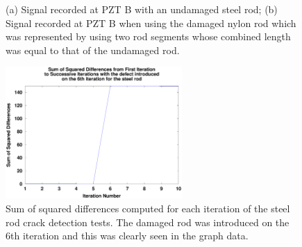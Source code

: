 \begin{figure}[ht!]
\begin{subfigmatrix}{2}
\end{subfigmatrix}

  \caption
  { \label{fig:steelCrackResults}
(a) Signal recorded at PZT B with an undamaged steel rod;
(b) Signal recorded at PZT B when using the damaged nylon rod which was represented by using two rod segments whose combined length was equal to that of the undamaged rod.
}
\end{figure}

\begin{figure}[ht!]
\centering
\includegraphics[width=0.6\textwidth]{eps_pics/steelDifferences}
\caption{Sum of squared differences computed for each iteration of the steel rod crack detection tests. The damaged rod was introduced on the 6th iteration and this was clearly seen in the graph data.
 	 \label{fig:steelDifferences}} 
\end{figure}


